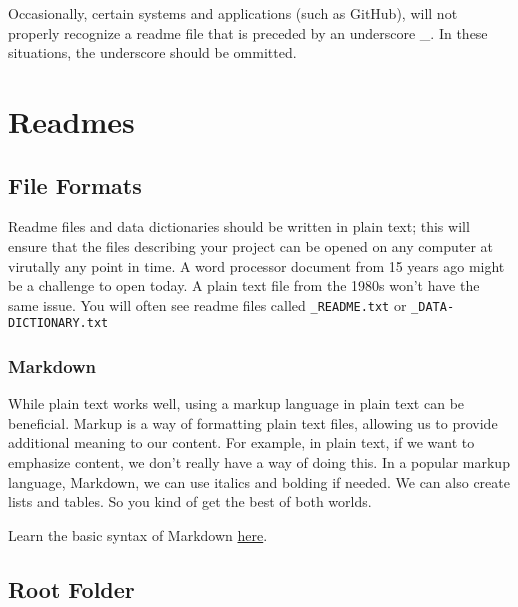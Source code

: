 \documentclass[
]{book}
\begin{document}
Occasionally, certain systems and applications (such as GitHub), will not properly recognize a readme file that is preceded by an underscore \_. In these situations, the underscore should be ommitted.

\hypertarget{readmes}{%
\section*{Readmes}\label{readmes}}

\hypertarget{file-formats-2}{%
\subsection*{File Formats}\label{file-formats-2}}

Readme files and data dictionaries should be written in plain text; this will ensure that the files describing your project can be opened on any computer at virutally any point in time. A word processor document from 15 years ago might be a challenge to open today. A plain text file from the 1980s won't have the same issue. You will often see readme files called \texttt{\_README.txt} or \texttt{\_DATA-DICTIONARY.txt}

\hypertarget{markdown}{%
\subsubsection*{Markdown}\label{markdown}}

While plain text works well, using a markup language in plain text can be beneficial. Markup is a way of formatting plain text files, allowing us to provide additional meaning to our content. For example, in plain text, if we want to emphasize content, we don't really have a way of doing this. In a popular markup language, Markdown, we can use italics and bolding if needed. We can also create lists and tables. So you kind of get the best of both worlds.

Learn the basic syntax of Markdown \href{https://www.markdownguide.org/basic-syntax/}{here}.

\hypertarget{root-folder}{%
\subsection*{Root Folder}\label{root-folder}}
\end{document}
